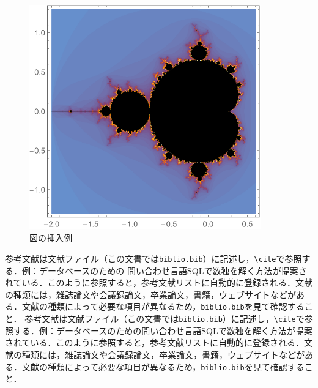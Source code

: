 \begin{figure}[htb]
\centering
\includegraphics[width=10cm]{figure.pdf}
\caption{図の挿入例}\label{サンプル図}
\end{figure}

参考文献は文献ファイル（この文書では\verb|biblio.bib|）に記述し，\verb|\cite|で参照する．例：データベースのための	問い合わせ言語SQLで数独を解く方法が提案されている\cite{yabuki2011}．このように参照すると，参考文献リストに自動的に登録される．文献の種類には，雑誌論文\cite{yabuki2011}や会議録論文\cite{yabuki2013}，卒業論文\cite{kubo2014}，書籍\cite{okumura2013}，ウェブサイト\cite{self}などがある．文献の種類によって必要な項目が異なるため，\verb|biblio.bib|を見て確認すること．
参考文献は文献ファイル（この文書では\verb|biblio.bib|）に記述し，\verb|\cite|で参照する．例：データベースのための問い合わせ言語SQLで数独を解く方法が提案されている\cite{yabuki2011}．このように参照すると，参考文献リストに自動的に登録される．文献の種類には，雑誌論文\cite{yabuki2011}や会議録論文\cite{yabuki2013}，卒業論文\cite{kubo2014}，書籍\cite{okumura2013}，ウェブサイト\cite{self}などがある．文献の種類によって必要な項目が異なるため，\verb|biblio.bib|を見て確認すること．




